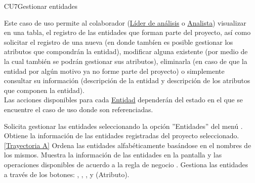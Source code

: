 	\begin{UseCase}{CU7}{Gestionar entidades}{
			
		Este caso de uso permite al colaborador (\hyperlink{jefe}{Líder de análisis} o \hyperlink{analista}{Analista}) visualizar en una tabla, el registro de las entidades que forman parte del proyecto, así como solicitar el registro de una nueva (en donde tambíen es posible gestionar los atributos que compondrán la entidad), modificar alguna existente (por medio de la cual también se podrán gestionar sus atributos), eliminarla (en caso de que la entidad por algún motivo ya no forme parte del proyecto) o simplemente consultar su información (descripción de la entidad y descripción de los atributos que componen la entidad). \\
     	Las acciones disponibles para cada \hyperlink{entidadEntidad}{Entidad} dependerán del estado en el que se encuentre el caso de uso donde son referenciadas. 
	}
	
\end{UseCase}
\begin{UCtrayectoria}
	\UCpaso[\UCactor] Solicita gestionar las entidades seleccionando la opción ''Entidades'' del menú .
	\UCpaso[\UCsist] Obtiene la información de las entidades registradas del proyecto seleccionado. \hyperlink{CU7:TAA}{[Trayectoria A]}
	\UCpaso[\UCsist] Ordena las entidades alfabéticamente basándose en el nombres de los mismos.
	\UCpaso[\UCsist] Muestra la información de las entidades en la pantalla  y las operaciones disponibles de acuerdo a la regla de negocio . \label{CU7-P4}
	\UCpaso[\UCactor] Gestiona las entidades a través de los botones: , \editar , \eliminar,  y (Atributo). 
\end{UCtrayectoria}		
